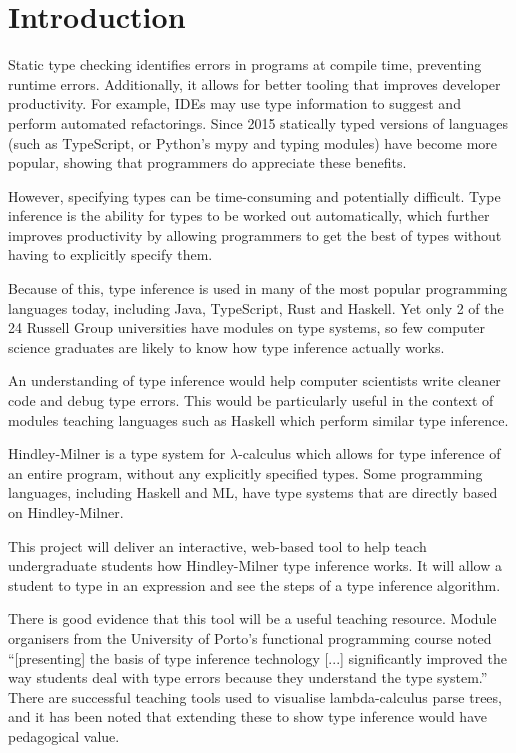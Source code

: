 \documentclass[12pt]{article}
\begin{document}
\maketitle

\section{Introduction}

Static type checking identifies errors in programs at compile time, preventing runtime errors. Additionally, it allows for better tooling that improves developer productivity. For example, IDEs may use type information to suggest and perform automated refactorings.\cite{ref1}\cite{ref2} Since 2015 statically typed versions of languages (such as TypeScript, or Python’s mypy and typing modules\cite{ref3}) have become more popular, showing that programmers do appreciate these benefits.

However, specifying types can be time-consuming and potentially difficult. Type inference is the ability for types to be worked out automatically, which further improves productivity by allowing programmers to get the best of types without having to explicitly specify them.

Because of this, type inference is used in many of the most popular programming languages today, including Java, TypeScript, Rust and Haskell. Yet only 2 of the 24 Russell Group universities have modules on type systems, so few computer science graduates are likely to know how type inference actually works.

An understanding of type inference would help computer scientists write cleaner code and debug type errors. This would be particularly useful in the context of modules teaching languages such as Haskell which perform similar type inference.

Hindley-Milner is a type system for $\lambda$-calculus which allows for type inference of an entire program, without any explicitly specified types. Some programming languages, including Haskell and ML, have type systems that are directly based on Hindley-Milner.

This project will deliver an interactive, web-based tool to help teach undergraduate students how Hindley-Milner type inference works. It will allow a student to type in an expression and see the steps of a type inference algorithm.

There is good evidence that this tool will be a useful teaching resource. Module organisers from the University of Porto’s functional programming course noted “[presenting] the basis of type inference technology [...] significantly improved the way students deal with type errors because they understand the type system.”\cite{ref4} There are successful teaching tools used to visualise lambda-calculus parse trees, and it has been noted that extending these to show type inference would have pedagogical value.\cite{ref5}
\end{document}
